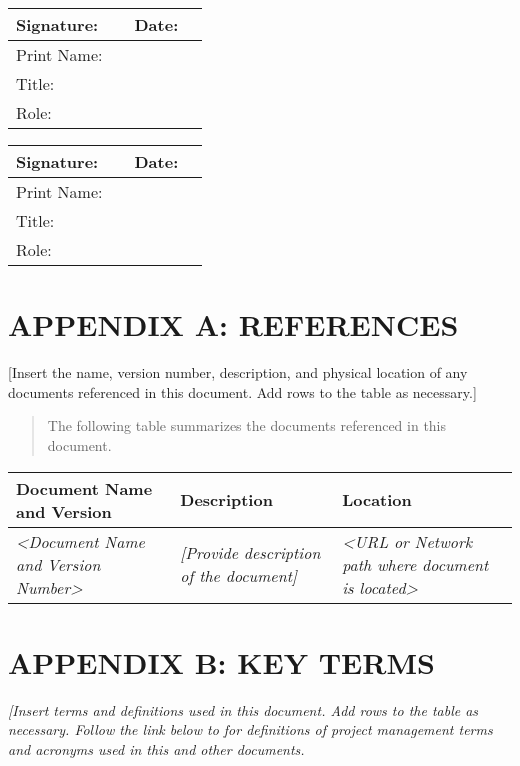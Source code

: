 \documentclass[a4paper, 11pt]{article}
\begin{document}
\begin{longtable}[]{@{}llll@{}}
\toprule
Signature: & & Date: &\tabularnewline
\midrule
\endhead
Print Name: & & &\tabularnewline
Title: & & &\tabularnewline
Role: & & &\tabularnewline
\bottomrule
\end{longtable}

\begin{longtable}[]{@{}llll@{}}
\toprule
Signature: & & Date: &\tabularnewline
\midrule
\endhead
Print Name: & & &\tabularnewline
Title: & & &\tabularnewline
Role: & & &\tabularnewline
\bottomrule
\end{longtable}

\newpage


\section{APPENDIX A: REFERENCES}

{[}Insert the name, version number, description, and physical location
of any documents referenced in this document. Add rows to the table as
necessary.{]}

\begin{quote}
The following table summarizes the documents referenced in this
document.
\end{quote}

\begin{longtable}[]{@{}lll@{}}
\toprule
\textbf{Document Name and Version} & \textbf{Description} &
\textbf{Location}\tabularnewline
\midrule
\endhead
\emph{\textless{}Document Name and Version Number\textgreater{}} &
\emph{{[}Provide description of the document{]}} & \emph{\textless{}URL
or Network path where document is located\textgreater{}}\tabularnewline
\bottomrule
\end{longtable}

\newpage


\section{APPENDIX B: KEY TERMS}

\emph{{[}Insert terms and definitions used in this document. Add rows to
the table as necessary. Follow the link below to for definitions of
project management terms and acronyms used in this and other documents.}
\end{document}
